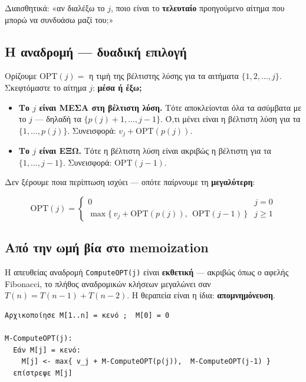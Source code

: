 \documentclass[11pt,a4paper]{article}
\begin{document}
Διαισθητικά: «αν διαλέξω το $j$, ποιο είναι το \textbf{τελευταίο} προηγούμενο
αίτημα που μπορώ να συνδυάσω μαζί του;»

\subsection{Η αναδρομή --- δυαδική επιλογή}

Ορίζουμε $\text{OPT}(j) = $ η τιμή της βέλτιστης λύσης για τα αιτήματα
$\{1, 2, \dots, j\}$. Σκεφτόμαστε το αίτημα $j$: \textbf{μέσα ή έξω;}
\begin{itemize}
  \item \textbf{Το $j$ είναι ΜΕΣΑ στη βέλτιστη λύση.} Τότε αποκλείονται όλα τα
  ασύμβατα με το $j$ --- δηλαδή τα $\{p(j)+1, \dots, j-1\}$. Ό,τι μένει είναι η
  βέλτιστη λύση για τα $\{1, \dots, p(j)\}$. Συνεισφορά:
  $v_j + \text{OPT}(p(j))$.
  \item \textbf{Το $j$ είναι ΕΞΩ.} Τότε η βέλτιστη λύση είναι ακριβώς η βέλτιστη
  για τα $\{1, \dots, j-1\}$. Συνεισφορά: $\text{OPT}(j-1)$.
\end{itemize}
Δεν ξέρουμε ποια περίπτωση ισχύει --- οπότε παίρνουμε τη \textbf{μεγαλύτερη}:

\begin{keypoint}
\[
\text{OPT}(j) =
\begin{cases}
0 & j = 0 \\[4pt]
\max\bigl\{\, v_j + \text{OPT}(p(j)),\ \ \text{OPT}(j-1) \,\bigr\} & j \ge 1
\end{cases}
\]
\end{keypoint}

\subsection{Από την ωμή βία στο memoization}

Η απευθείας αναδρομή \texttt{ComputeOPT(j)} είναι \textbf{εκθετική} --- ακριβώς
όπως ο αφελής Fibonacci, το πλήθος αναδρομικών κλήσεων μεγαλώνει σαν
$T(n) = T(n-1) + T(n-2)$. Η θεραπεία είναι η ίδια: \textbf{απομνημόνευση}.

\begin{codebox}
\begin{verbatim}
Αρχικοποίησε M[1..n] = κενό ;  M[0] = 0

M-ComputeOPT(j):
  Εάν M[j] = κενό:
    M[j] <- max{ v_j + M-ComputeOPT(p(j)),  M-ComputeOPT(j-1) }
  επίστρεψε M[j]
\end{verbatim}
\end{codebox}
\end{document}
